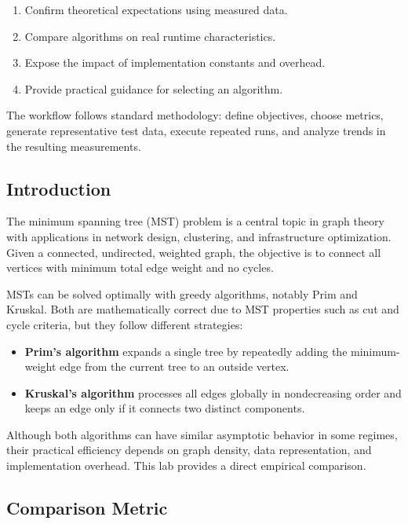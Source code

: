 \documentclass{labreport}
\begin{document}
\begin{enumerate}
    \item Confirm theoretical expectations using measured data.
    \item Compare algorithms on real runtime characteristics.
    \item Expose the impact of implementation constants and overhead.
    \item Provide practical guidance for selecting an algorithm.
\end{enumerate}

The workflow follows standard methodology: define objectives, choose metrics, generate representative test data, execute repeated runs, and analyze trends in the resulting measurements.

\subsection{Introduction}

The minimum spanning tree (MST) problem is a central topic in graph theory with applications in network design, clustering, and infrastructure optimization. Given a connected, undirected, weighted graph, the objective is to connect all vertices with minimum total edge weight and no cycles.

MSTs can be solved optimally with greedy algorithms, notably Prim and Kruskal. Both are mathematically correct due to MST properties such as cut and cycle criteria, but they follow different strategies:

\begin{itemize}
    \item \textbf{Prim's algorithm} expands a single tree by repeatedly adding the minimum-weight edge from the current tree to an outside vertex.

    \item \textbf{Kruskal's algorithm} processes all edges globally in nondecreasing order and keeps an edge only if it connects two distinct components.
\end{itemize}

Although both algorithms can have similar asymptotic behavior in some regimes, their practical efficiency depends on graph density, data representation, and implementation overhead. This lab provides a direct empirical comparison.

\subsection{Comparison Metric}
\end{document}
